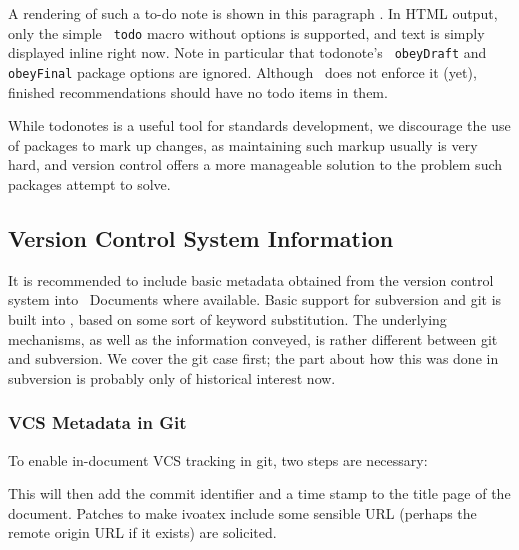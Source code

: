 \documentclass[11pt,a4paper]{ivoa}
\newcommand{\texword}[1]{\texttt{\color{texcolor} #1}}
\begin{document}
A rendering of such a to-do note is shown in this paragraph
. In HTML output,
only the simple \texword{todo} macro without options is supported, and
text is simply displayed inline right now.  Note in particular that
todonote's \texword{obeyDraft} and \texword{obeyFinal} package options
are ignored.  Although \ivoatex\ does not enforce it (yet), finished
recommendations should have no todo items in them.

While todonotes is a useful tool for standards development, we
discourage the use of packages to mark up changes, as maintaining such
markup usually is very hard, and version control offers a more
manageable solution to the problem such packages attempt to solve.

\subsection{Version Control System Information}
\label{sect:vcs}

It is recommended to include basic metadata obtained from the version
control system into \ivoatex~Documents where available.  Basic support
for subversion and git is built into \ivoatex, based on some sort
of keyword substitution.  The underlying mechanisms, as well as
the information conveyed, is rather different between git and
subversion.  We cover the git case first; the part about how this was
done in subversion is probably only of historical interest now.

\subsubsection{VCS Metadata in Git}

To enable in-document VCS tracking in git, two steps are necessary:


This will then add the commit identifier and a time stamp to the title
page of the document.  Patches to make ivoatex include some sensible URL
(perhaps the remote origin URL if it exists) are solicited.
\end{document}
